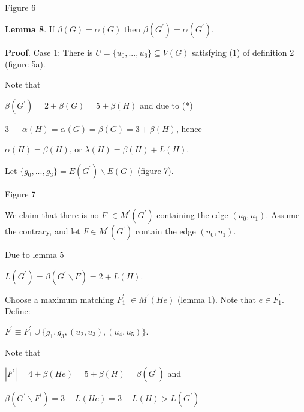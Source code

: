 \documentclass{article}
\begin{document}
\begin{center}

Figure 6\bigskip
\end{center}

\textbf{Lemma 8}. If $\beta (G)=\alpha (G)$ then $\beta (G^{\prime })=\alpha
(G^{\prime })$.

\textbf{Proof}. Case 1: There is $U=\{u_{0},...,u_{6}\}\subseteq V(G)$
satisfying (1) of definition 2 (figure 5a).

Note that

\begin{center}
$\beta (G^{\prime })=2+\beta (G)=5+\beta (H)$ and due to (*)

$3+$ $\alpha (H)=\alpha (G)=\beta (G)=3+\beta (H)$, hence

$\alpha (H)=\beta (H)$, or $\lambda (H)=\beta (H)+L(H)$.
\end{center}

Let $\{g_{0},...,g_{3}\}=E(G^{\prime })\backslash E(G)$ (figure 7).

\begin{center}

Figure 7\bigskip
\end{center}

We claim that there is no $F$ $\in M^{\prime }(G^{\prime })$ containing the
edge $(u_{0},u_{1})$. Assume the contrary, and let $F\in M^{\prime
}(G^{\prime })$ contain the edge $(u_{0},u_{1})$.

Due to lemma 5

\begin{center}
$L(G^{\prime })=\beta (G^{\prime }\backslash F)=2+L(H)$.
\end{center}

Choose a maximum matching $F_{1}^{\prime }$ $\in M^{\prime }(He)$ (lemma 1).
Note that $e\in F_{1}^{\prime }$. Define:

\begin{center}
$F^{\prime }\equiv F_{1}^{\prime }\cup
\{g_{1},g_{3},(u_{2},u_{3}),(u_{4},u_{5})\}$.
\end{center}

Note that

\begin{center}
$\left\vert F^{\prime }\right\vert =4+\beta (He)=5+\beta (H)=\beta
(G^{\prime })$ and

$\beta (G^{\prime }\backslash F^{\prime })=3+L(He)=3+L(H)>L(G^{\prime })$
\end{center}
\end{document}
